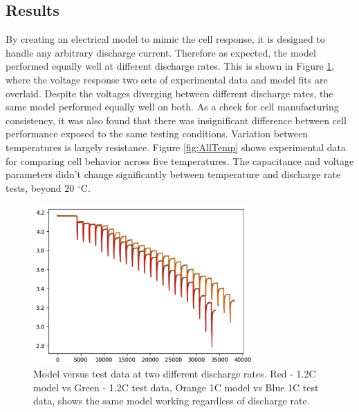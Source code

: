\documentclass[]{aiaa-tc}%
\begin{document}
\subsection{Results}

By creating an electrical model to mimic the cell response, it is designed to handle any arbitrary discharge current. Therefore as expected, the model performed equally well at different discharge rates. This is shown in Figure \ref{fig:paramE}, where the voltage response two sets of experimental data and model fits are overlaid. Despite the voltages diverging between different discharge rates, the same model performed equally well on both. As a check for cell manufacturing consistency, it was also found that there was insignificant difference between cell performance exposed to the same testing conditions. Variation between temperatures is largely resistance.  Figure \ref{fig:AllTemp} shows experimental data for comparing cell behavior across five temperatures. The capacitance and voltage parameters didn't change significantly between temperature and discharge rate tests, beyond 20 $^\circ$C. 

\begin{figure}[!htb]
	\centering
	\includegraphics[width=0.75\textwidth]{figures/1_1o2C_20C.png}
	\caption{Model versus test data at two different discharge rates. Red - 1.2C model vs Green - 1.2C test data, Orange 1C model vs Blue 1C test data, shows the same model working regardless of discharge rate.}
	\label{fig:paramE}
\end{figure}
\end{document}
